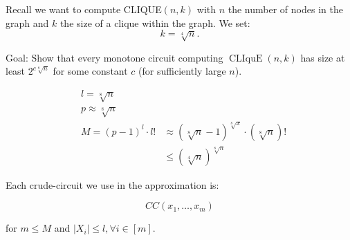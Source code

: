 Recall we want to compute CLIQUE$(n, k)$
with $n$ the number of nodes in the graph and $k$ the size of a clique within the graph. 
We set:
$$
k=\sqrt[4]{n}.
$$


Goal: Show that every monotone circuit computing $\operatorname{CLIquE}(n,k)$ has size at least $2^{c \sqrt[8]{n}}$ for some constant $c$ (for sufficiently large $n$).

$$
\begin{aligned}
& l=\sqrt[8]{n} \\
& p \approx \sqrt[8]{n} \\
& M=(p-1)^l \cdot l! & \approx(\sqrt[8]{n}-1)^{\sqrt[8]{x}} \cdot(\sqrt[8]{n})! \\
& & \leq(\sqrt[4]{n})^{\sqrt[8]{n}}
\end{aligned}
$$


Each crude-circuit we use in the approximation is:

$$
C C\left(x_1, \ldots, x_m\right)
$$

for $m \leqslant M$ and $\left|X_i\right| \leqslant l, \forall i \in[m]$.
